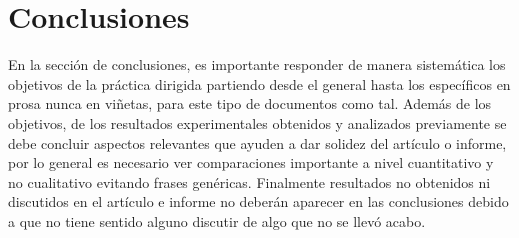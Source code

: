 \documentclass[conference]{IEEEtran}
\begin{document}
\section{Conclusiones}
 En la sección de conclusiones, es importante responder de manera sistemática los objetivos de la práctica dirigida partiendo desde el general hasta los específicos en prosa nunca en viñetas, para este tipo de documentos como tal. Además de los objetivos, de los resultados experimentales obtenidos y analizados previamente se debe concluir aspectos relevantes que ayuden a dar solidez del artículo o informe, por lo general es necesario ver comparaciones importante a nivel cuantitativo y no cualitativo evitando frases genéricas. Finalmente resultados no obtenidos ni discutidos en el artículo e informe no deberán aparecer en las conclusiones debido a que no tiene sentido alguno discutir de algo que no se llevó acabo.



\end{document}
